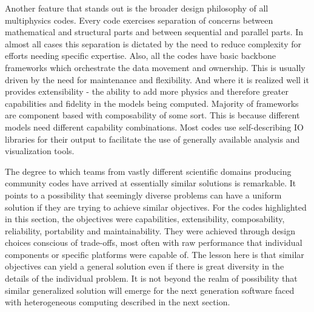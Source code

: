 Another feature that stands out is the broader design philosophy of
all multiphysics codes. Every code exercises separation of concerns
between mathematical and structural parts and between sequential and
parallel parts. In almost all cases this separation is dictated by the
need to reduce complexity for efforts needing specific
expertise. Also, all the codes have basic backbone frameworks which
orchestrate the data movement and ownership. This is
usually driven by the need for maintenance and flexibility. And where
it is realized well it provides extensibility - the ability to add
more physics and therefore greater capabilities and fidelity in the
models being computed. Majority of frameworks are component based with
composability of some sort. This is because different models need
different capability combinations. Most codes use self-describing IO
libraries for their output to facilitate the use of generally
available analysis and visualization tools. 

The degree to which teams from vastly different scientific domains
producing community codes have arrived at essentially similar
solutions is remarkable. It points to a possibility that seemingly
diverse problems can have a uniform solution if they are trying to
achieve similar objectives. For the codes highlighted in this section,
the objectives were capabilities, extensibility, composability,
reliability, portability and maintainability. They were achieved
through design choices conscious of trade-offs, most often with raw
performance that individual components or specific platforms were
capable of. The lesson here is that similar objectives can yield a
general solution even if there is great diversity in the details of
the individual problem. It is not beyond the realm of possibility that
similar generalized solution will emerge for the next generation
software faced with heterogeneous computing described in the next
section.
